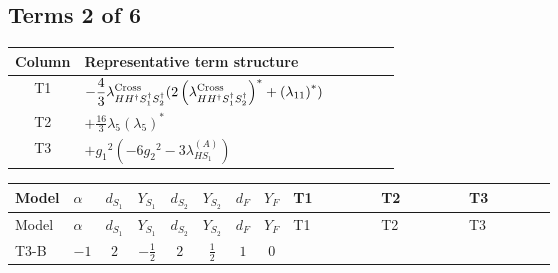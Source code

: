 \documentclass[8pt]{article}
\begin{document}
\begin{landscape}
\subsection*{Terms 2 of 6}
\begin{center}
\begin{tabular}{@{}c >{\raggedright\arraybackslash}p{0.82\linewidth}@{}}
\toprule
Column & Representative term structure \\
\midrule
T1 & \(\displaystyle -\frac{4}{3} {\lambda_{H H^\dagger S_1^\dagger S_2^\dagger}^{\rm Cross}} (2 \left({\lambda_{H H^\dagger S_1^\dagger S_2^\dagger}^{\rm Cross}}\right)^{*}+\left({\lambda_{11}}\right)^{*})\) \\
\midrule
T2 & \(\displaystyle +\frac{16}{3} {\lambda_5} \left({\lambda_5}\right)^{*}\) \\
\midrule
T3 & \(\displaystyle +{g_1}^2 \left(-6 {g_2}^2-3 {\lambda_{HS_1}^{(A)}}\right)\) \\
\midrule
\bottomrule
\end{tabular}
\end{center}
\smallskip
\tiny
\begin{longtable}{@{}llcccccc >{\raggedright\arraybackslash}p{0.21\linewidth} >{\raggedright\arraybackslash}p{0.21\linewidth} >{\raggedright\arraybackslash}p{0.21\linewidth}@{}}
\toprule
Model & $\alpha$ & $d_{S_1}$ & $Y_{S_1}$ & $d_{S_2}$ & $Y_{S_2}$ & $d_F$ & $Y_F$ & T1 & T2 & T3 \\
\midrule
\endfirsthead
\toprule
Model & $\alpha$ & $d_{S_1}$ & $Y_{S_1}$ & $d_{S_2}$ & $Y_{S_2}$ & $d_F$ & $Y_F$ & T1 & T2 & T3 \\
\midrule
\endhead
T3-B & $-1$ & $2$ & $-\frac{1}{2}$ & $2$ & $\frac{1}{2}$ & $1$ & $0$ & \scriptsize\adjustbox{max width=\linewidth}{$\begin{gathered} -\frac{4}{3} {\lambda_{H H^\dagger S_1^\dagger S_2^\dagger}^{\rm Cross}} (2 \left({\lambda_{H H^\dagger S_1^\dagger S_2^\dagger}^{\rm Cross}}\right)^{*}+\left({\lambda_{11}}\right)^{*})\end{gathered}$} & \scriptsize\adjustbox{max width=\linewidth}{$\begin{gathered} +\frac{16}{3} {\lambda_5} \left({\lambda_5}\right)^{*}\end{gathered}$} & \scriptsize\adjustbox{max width=\linewidth}{$\begin{gathered} +{g_1}^2 \left(-6 {g_2}^2-3 {\lambda_{HS_1}^{(A)}}\right)\end{gathered}$} \\
\midrule

\end{longtable}
\end{landscape}
\end{document}
